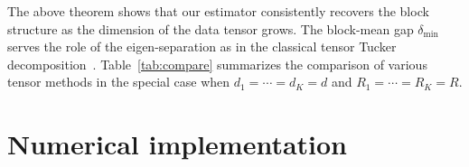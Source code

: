 \documentclass{article}
\newtheorem{theorem}{Theorem}
\begin{document}
The above theorem shows that our estimator consistently recovers the block structure as the dimension of the data tensor grows. The block-mean gap $\delta_{\min}$ serves the role of the eigen-separation as in the classical tensor Tucker decomposition~\cite{zhang2018tensor}. Table~\ref{tab:compare} summarizes the comparison of various tensor methods in the special case when $d_1=\cdots=d_K=d$ and $R_1=\cdots=R_K=R$. 
\begin{table}[htbp]
\caption{Comparison of various tensor decomposition methods.}\label{tab:compare}

\end{table}



\vspace{-1cm}
\section{Numerical implementation}
\end{document}
